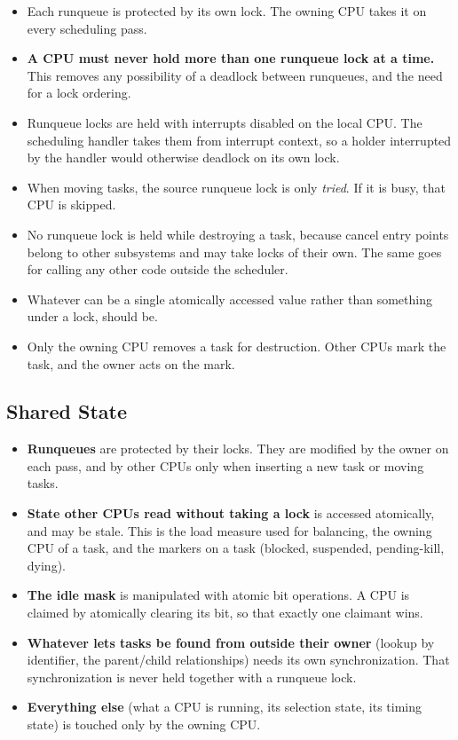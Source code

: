 \documentclass[11pt]{article}
\begin{document}
\begin{itemize}
	\item Each runqueue is protected by its own lock. The owning CPU takes it on every scheduling pass.
	\item \textbf{A CPU must never hold more than one runqueue lock at a time.} This removes any possibility of a deadlock between runqueues, and the need for a lock ordering.
	\item Runqueue locks are held with interrupts disabled on the local CPU. The scheduling handler takes them from interrupt context, so a holder interrupted by the handler would otherwise deadlock on its own lock.
	\item When moving tasks, the source runqueue lock is only \textit{tried}. If it is busy, that CPU is skipped.
	\item No runqueue lock is held while destroying a task, because cancel entry points belong to other subsystems and may take locks of their own. The same goes for calling any other code outside the scheduler.
	\item Whatever can be a single atomically accessed value rather than something under a lock, should be.
	\item Only the owning CPU removes a task for destruction. Other CPUs mark the task, and the owner acts on the mark.
\end{itemize}

\subsection{Shared State}

\begin{itemize}
	\item \textbf{Runqueues} are protected by their locks. They are modified by the owner on each pass, and by other CPUs only when inserting a new task or moving tasks.
	\item \textbf{State other CPUs read without taking a lock} is accessed atomically, and may be stale. This is the load measure used for balancing, the owning CPU of a task, and the markers on a task (blocked, suspended, pending-kill, dying).
	\item \textbf{The idle mask} is manipulated with atomic bit operations. A CPU is claimed by atomically clearing its bit, so that exactly one claimant wins.
	\item \textbf{Whatever lets tasks be found from outside their owner} (lookup by identifier, the parent/child relationships) needs its own synchronization. That synchronization is never held together with a runqueue lock.
	\item \textbf{Everything else} (what a CPU is running, its selection state, its timing state) is touched only by the owning CPU.
\end{itemize}
\end{document}
